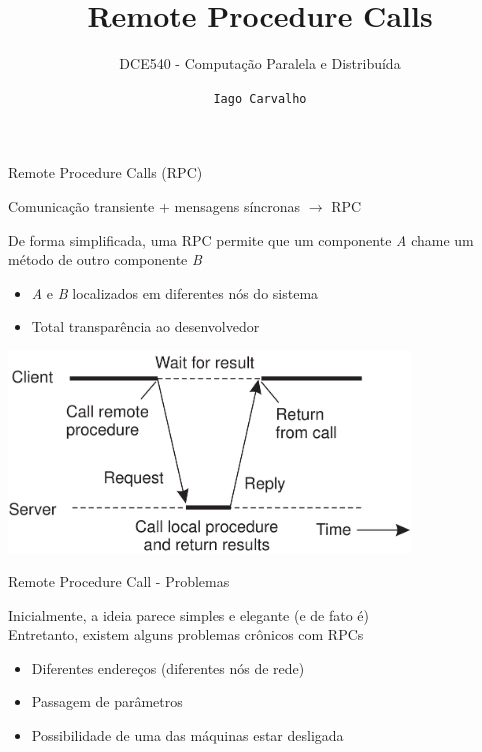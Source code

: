 \documentclass[compress]{beamer}
\title{Remote Procedure Calls}
\subtitle{DCE540 - Computação Paralela e Distribuída}
\author{\texttt{Iago Carvalho}}
\institute{\texttt{Departamento de Ciência da Computação}}
\begin{document}
\begin{frame}
\titlepage

\end{frame}


\begin{frame}{Remote Procedure Calls (RPC)}

Comunicação transiente + mensagens síncronas \textcolor{sthlmDarkBlue}{$\rightarrow$} RPC

\vspace{0.5cm}

De forma simplificada, uma RPC permite que um componente \textit{A} chame um método de outro componente \textit{B}
\begin{itemize}
    \item \textit{A} e \textit{B} localizados em diferentes nós do sistema
    \item Total transparência ao desenvolvedor
\end{itemize}

\vspace{0.25cm}

\centering\includegraphics[width=0.8\textwidth]{images/rpc.png}

\end{frame}



\begin{frame}{Remote Procedure Call - Problemas}

Inicialmente, a ideia parece simples e elegante (e de fato é) \\
Entretanto, existem alguns problemas crônicos com RPCs

\vspace{0.5cm}

\begin{itemize}
    \item Diferentes endereços (diferentes nós de rede)
    \item Passagem de parâmetros
    \item Possibilidade de uma das máquinas estar desligada
\end{itemize}


\end{frame}
\end{document}
